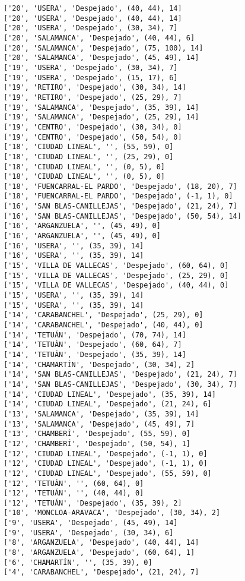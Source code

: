 \documentclass[11pt]{article}
\begin{document}
\begin{Verbatim}[commandchars=\\\{\}]
['20', 'USERA', 'Despejado', (40, 44), 14]
['20', 'USERA', 'Despejado', (40, 44), 14]
['20', 'USERA', 'Despejado', (30, 34), 7]
['20', 'SALAMANCA', 'Despejado', (40, 44), 6]
['20', 'SALAMANCA', 'Despejado', (75, 100), 14]
['20', 'SALAMANCA', 'Despejado', (45, 49), 14]
['19', 'USERA', 'Despejado', (30, 34), 7]
['19', 'USERA', 'Despejado', (15, 17), 6]
['19', 'RETIRO', 'Despejado', (30, 34), 14]
['19', 'RETIRO', 'Despejado', (25, 29), 7]
['19', 'SALAMANCA', 'Despejado', (35, 39), 14]
['19', 'SALAMANCA', 'Despejado', (25, 29), 14]
['19', 'CENTRO', 'Despejado', (30, 34), 0]
['19', 'CENTRO', 'Despejado', (50, 54), 0]
['18', 'CIUDAD LINEAL', '', (55, 59), 0]
['18', 'CIUDAD LINEAL', '', (25, 29), 0]
['18', 'CIUDAD LINEAL', '', (0, 5), 0]
['18', 'CIUDAD LINEAL', '', (0, 5), 0]
['18', 'FUENCARRAL-EL PARDO', 'Despejado', (18, 20), 7]
['18', 'FUENCARRAL-EL PARDO', 'Despejado', (-1, 1), 0]
['16', 'SAN BLAS-CANILLEJAS', 'Despejado', (21, 24), 7]
['16', 'SAN BLAS-CANILLEJAS', 'Despejado', (50, 54), 14]
['16', 'ARGANZUELA', '', (45, 49), 0]
['16', 'ARGANZUELA', '', (45, 49), 0]
['16', 'USERA', '', (35, 39), 14]
['16', 'USERA', '', (35, 39), 14]
['15', 'VILLA DE VALLECAS', 'Despejado', (60, 64), 0]
['15', 'VILLA DE VALLECAS', 'Despejado', (25, 29), 0]
['15', 'VILLA DE VALLECAS', 'Despejado', (40, 44), 0]
['15', 'USERA', '', (35, 39), 14]
['15', 'USERA', '', (35, 39), 14]
['14', 'CARABANCHEL', 'Despejado', (25, 29), 0]
['14', 'CARABANCHEL', 'Despejado', (40, 44), 0]
['14', 'TETUÁN', 'Despejado', (70, 74), 14]
['14', 'TETUÁN', 'Despejado', (60, 64), 7]
['14', 'TETUÁN', 'Despejado', (35, 39), 14]
['14', 'CHAMARTÍN', 'Despejado', (30, 34), 2]
['14', 'SAN BLAS-CANILLEJAS', 'Despejado', (21, 24), 7]
['14', 'SAN BLAS-CANILLEJAS', 'Despejado', (30, 34), 7]
['14', 'CIUDAD LINEAL', 'Despejado', (35, 39), 14]
['14', 'CIUDAD LINEAL', 'Despejado', (21, 24), 6]
['13', 'SALAMANCA', 'Despejado', (35, 39), 14]
['13', 'SALAMANCA', 'Despejado', (45, 49), 7]
['13', 'CHAMBERÍ', 'Despejado', (55, 59), 0]
['12', 'CHAMBERÍ', 'Despejado', (50, 54), 1]
['12', 'CIUDAD LINEAL', 'Despejado', (-1, 1), 0]
['12', 'CIUDAD LINEAL', 'Despejado', (-1, 1), 0]
['12', 'CIUDAD LINEAL', 'Despejado', (55, 59), 0]
['12', 'TETUÁN', '', (60, 64), 0]
['12', 'TETUÁN', '', (40, 44), 0]
['12', 'TETUÁN', 'Despejado', (35, 39), 2]
['10', 'MONCLOA-ARAVACA', 'Despejado', (30, 34), 2]
['9', 'USERA', 'Despejado', (45, 49), 14]
['9', 'USERA', 'Despejado', (30, 34), 6]
['8', 'ARGANZUELA', 'Despejado', (40, 44), 14]
['8', 'ARGANZUELA', 'Despejado', (60, 64), 1]
['6', 'CHAMARTÍN', '', (35, 39), 0]
['4', 'CARABANCHEL', 'Despejado', (21, 24), 7]

\end{Verbatim}
\end{document}
